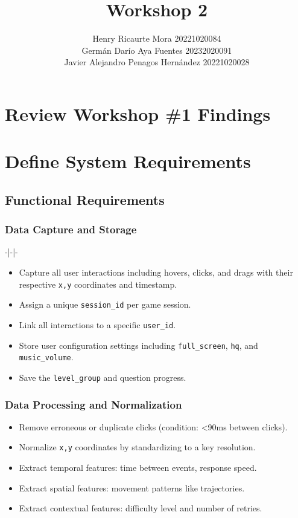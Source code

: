 \documentclass{article}
\title{Workshop 2}
\author{
Henry Ricaurte Mora 20221020084 \\
Germán Darío Aya Fuentes 20232020091 \\
Javier Alejandro Penagos Hernández 20221020028
}
\date{}
\newcommand{\reqnum}[1]{\textbf{\underline{RF-#1}}}
\begin{document}
\maketitle

\section{Review Workshop {\#}1 Findings}

\section{Define System Requirements}

\subsection{Functional Requirements}

\subsubsection{Data Capture and Storage} -|-|-
\begin{itemize}
    \item[\reqnum{001}] Capture all user interactions including hovers, clicks, and drags with their respective \texttt{x,y} coordinates and timestamp.
    \item[\reqnum{002}] Assign a unique \texttt{session\_id} per game session.
    \item[\reqnum{003}] Link all interactions to a specific \texttt{user\_id}.
    \item[\reqnum{004}] Store user configuration settings including \texttt{full\_screen}, \texttt{hq}, and \texttt{music\_volume}.
    \item[\reqnum{005}] Save the \texttt{level\_group} and question progress.
\end{itemize}

\subsubsection{Data Processing and Normalization}
\begin{itemize}
    \item[\reqnum{006}] Remove erroneous or duplicate clicks (condition: <90ms between clicks).
    \item[\reqnum{007}] Normalize \texttt{x,y} coordinates by standardizing to a key resolution.
    \item[\reqnum{008}] Extract temporal features: time between events, response speed.
    \item[\reqnum{009}] Extract spatial features: movement patterns like trajectories.
    \item[\reqnum{010}] Extract contextual features: difficulty level and number of retries.
\end{itemize}
\end{document}
